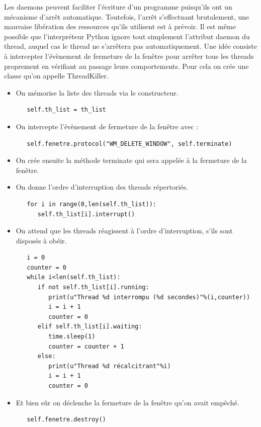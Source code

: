 \documentclass{article}
\begin{document}
Les daemons peuvent faciliter l’écriture d’un programme puisqu’ils ont un mécanisme d’arrêt automatique. Toutefois, l’arrêt s’effectuant brutalement, une mauvaise libération des ressources qu’ils utilisent est à prévoir. Il est même possible que l’interpréteur Python ignore tout simplement l’attribut daemon du thread, auquel cas le thread ne s’arrêtera pas automatiquement.
\medbreak
Une idée consiste à intercepter l’évènement de fermeture de la fenêtre pour arrêter tous les threads proprement en vérifiant au passage leurs comportements.
\medbreak
Pour cela on crée une classe qu’on appelle ThreadKiller.
\bigbreak
\begin{itemize}
\item On mémorise la liste des threads via le constructeur.
\medbreak
\begin{verbatim}
   self.th_list = th_list
\end{verbatim}
\bigbreak
\item On intercepte l’évènement de fermeture de la fenêtre avec :
\medbreak
\begin{verbatim}
   self.fenetre.protocol("WM_DELETE_WINDOW", self.terminate)
\end{verbatim}
\bigbreak
\item On crée ensuite la méthode terminate qui sera appelée à la fermeture de la fenêtre.
\bigbreak
\item On donne l’ordre d’interruption des threads répertoriés.
\medbreak
\begin{verbatim}
   for i in range(0,len(self.th_list)):
      self.th_list[i].interrupt()
\end{verbatim}
\bigbreak
\item On attend que les threads réagissent à l’ordre d’interruption, s’ils sont disposés à obéir.
\medbreak
\begin{verbatim}
   i = 0
   counter = 0
   while i<len(self.th_list):
      if not self.th_list[i].running:
         print(u"Thread %d interrompu (%d secondes)"%(i,counter))
         i = i + 1
         counter = 0
      elif self.th_list[i].waiting:
         time.sleep(1)
         counter = counter + 1
      else:
         print(u"Thread %d récalcitrant"%i)
         i = i + 1
         counter = 0
\end{verbatim}
\bigbreak
\item Et bien sûr on déclenche la fermeture de la fenêtre qu’on avait empêché.
\medbreak
\begin{verbatim}
   self.fenetre.destroy()
\end{verbatim}
\end{itemize}
\end{document}
